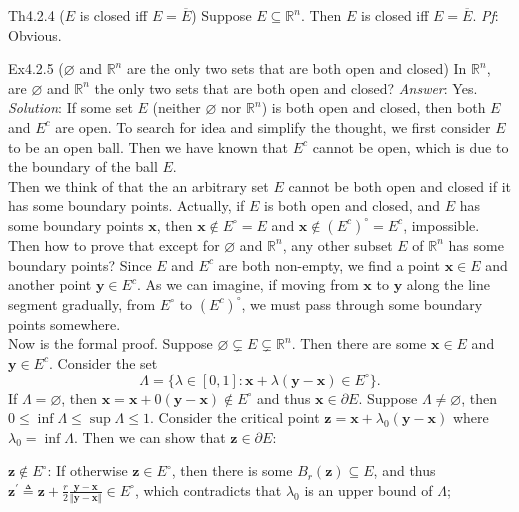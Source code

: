 \documentclass{article}
\begin{document}
\begin{Th}{Th4.2.4 ($E$ is closed iff $E = \overline{E}$)}
    Suppose $E\subseteq\mathbb{R}^n$. Then $E$ is closed iff $E = \overline{E}$.
    \tcblower
    \textit{Pf}: Obvious.
\end{Th}

\begin{Th}{Ex4.2.5 ($\varnothing$ and $\mathbb{R}^n$ are the only two sets that are both open and closed)}
    In $\mathbb{R}^n$, are $\varnothing$ and $\mathbb{R}^n$ the only two sets that are both open and closed?
    \tcblower
    \textit{Answer}: Yes.\\
    \textit{Solution}: If some set $E$ (neither $\varnothing$ nor $\mathbb{R}^n$) is both open and closed, then both $E$ and $E^c$ are open. To search for idea and simplify the thought, we first consider $E$ to be an open ball. Then we have known that $E^c$ cannot be open, which is due to the boundary of the ball $E$. \\
    Then we think of that the an arbitrary set $E$ cannot be both open and closed if it has some boundary points. Actually, if $E$ is both open and closed, and $E$ has some boundary points $\pmb{x}$, then $\pmb{x}\notin E^\circ = E$ and $\pmb{x}\notin (E^c)^\circ = E^c$, impossible. \\
    Then how to prove that except for $\varnothing$ and $\mathbb{R}^n$, any other subset $E$ of $\mathbb{R}^n$ has some boundary points? Since $E$ and $E^c$ are both non-empty, we find a point $\pmb{x}\in E$ and another point $\pmb{y}\in E^c$. As we can imagine, if moving from $\pmb{x}$ to $\pmb{y}$ along the line segment gradually, from $E^\circ$ to $(E^c)^\circ$, we must pass through some boundary points somewhere. \\
    Now is the formal proof. Suppose $\varnothing\subsetneq E\subsetneq\mathbb{R}^n$. Then there are some $\pmb{x}\in E$ and $\pmb{y}\in E^c$. Consider the set
    $$\Lambda = \{\lambda\in [0,1]: \pmb{x}+\lambda(\pmb{y}-\pmb{x})\in E^\circ\}.$$
    If $\Lambda = \varnothing$, then $\pmb{x} = \pmb{x}+0(\pmb{y}-\pmb{x})\notin E^\circ$ and thus $\pmb{x}\in\partial E$. Suppose $\Lambda\neq\varnothing$, then $0\leq\inf\Lambda\leq\sup\Lambda\leq 1$. Consider the critical point $\pmb{z} = \pmb{x}+\lambda_0(\pmb{y}-\pmb{x})$ where $\lambda_0 = \inf\Lambda$. Then we can show that $\pmb{z}\in\partial E$:
    \begin{compactenum}
        \item $\pmb{z}\notin E^\circ$: If otherwise $\pmb{z}\in E^\circ$, then there is some $B_r(\pmb{z})\subseteq E$, and thus $\pmb{z}^\prime\triangleq \pmb{z}+\frac{r}{2}\frac{\pmb{y}-\pmb{x}}{\Vert\pmb{y}-\pmb{x}\Vert}\in E^\circ$, which contradicts that $\lambda_0$ is an upper bound of $\Lambda$;

\end{compactenum}
\end{Th}
\end{document}
